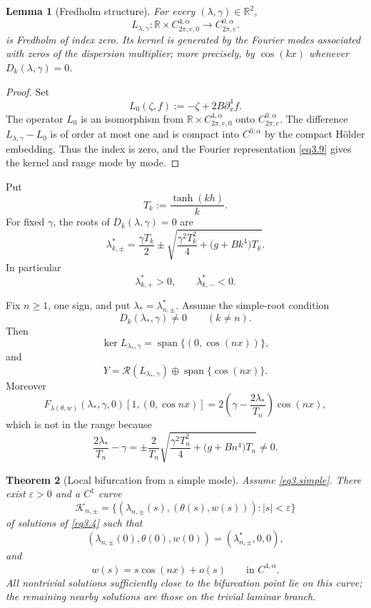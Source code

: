 \documentclass[12pt]{article}
\numberwithin{equation}{section}
\newtheorem{theorem}{Theorem}[section]
\newtheorem{lemma}[theorem]{Lemma}
\numberwithin{equation}{section}
\begin{document}
\begin{lemma}[Fredholm structure]\label{lem3fredholm}
For every $(\lambda,\gamma)\in\mathbb R^2$,
\[
L_{\lambda,\gamma}:
\mathbb R\times C^{4,\alpha}_{2\pi,e,0}
\longrightarrow
C^{0,\alpha}_{2\pi,e}.
\]
is Fredholm of index zero.  Its kernel is generated by the Fourier modes associated with zeros of the dispersion multiplier; more precisely, by $\cos(kx)$ whenever
$D_k(\lambda,\gamma)=0$.
\end{lemma}

\begin{proof}
Set
\[
L_0(\zeta,f):=-\zeta+2B\partial_x^4f.
\]
The operator $L_0$ is an isomorphism from
$\mathbb R\times C^{4,\alpha}_{2\pi,e,0}$ onto $C^{0,\alpha}_{2\pi,e}$.
The difference $L_{\lambda,\gamma}-L_0$ is of order at most one and is compact into
$C^{0,\alpha}$ by the compact H\"older embedding.  Thus the index is zero, and the
Fourier representation \eqref{eq3.9} gives the kernel and range mode by mode.
\end{proof}

Put
\[
T_k:=\frac{\tanh(kh)}{k}.
\]
For fixed $\gamma$, the roots of $D_k(\lambda,\gamma)=0$ are
\begin{equation}\label{eq3.11}
\lambda_{k,\pm}^*
=
\frac{\gamma T_k}{2}
\pm
\sqrt{
\frac{\gamma^2T_k^2}{4}
+\bigl(g+Bk^4\bigr)T_k
}.
\end{equation}
In particular
\[
\lambda_{k,+}^*>0,\qquad \lambda_{k,-}^*<0.
\]

Fix $n\ge1$, one sign, and put $\lambda_*=\lambda_{n,\pm}^*$.  Assume the simple-root
condition
\begin{equation}\label{eq3.simple}
D_k(\lambda_*,\gamma)\neq0
\qquad(k\neq n).
\end{equation}
Then
\[
\ker L_{\lambda_*,\gamma}
=\operatorname{span}\{(0,\cos(nx))\},
\]
and
\[
Y
=
\mathcal R(L_{\lambda_*,\gamma})
\oplus\operatorname{span}\{\cos(nx)\}.
\]
Moreover
\begin{equation}\label{eq3.trans}
F_{\lambda(\theta,w)}(\lambda_*,\gamma,0)[1,(0,\cos nx)]
=
2\left(\gamma-\frac{2\lambda_*}{T_n}\right)\cos(nx),
\end{equation}
which is not in the range because
\[
\frac{2\lambda_*}{T_n}-\gamma
=
\pm\frac2{T_n}
\sqrt{
\frac{\gamma^2T_n^2}{4}
+\bigl(g+Bn^4\bigr)T_n
}
\neq0.
\]

\begin{theorem}[Local bifurcation from a simple mode]\label{thm3.1}
Assume \eqref{eq3.simple}.  There exist $\varepsilon>0$ and a $C^1$ curve
\[
\mathcal K_{n,\pm}
=
\{(\lambda_{n,\pm}(s),(\theta(s),w(s))):|s|<\varepsilon\}
\]
of solutions of \eqref{eq3.4} such that
\[
(\lambda_{n,\pm}(0),\theta(0),w(0))
=(\lambda_{n,\pm}^*,0,0),
\]
and
\[
w(s)=s\cos(nx)+o(s)
\qquad\text{in }C^{4,\alpha}.
\]
All nontrivial solutions sufficiently close to the bifurcation point lie on this curve;
the remaining nearby solutions are those on the trivial laminar branch.
\end{theorem}
\end{document}
